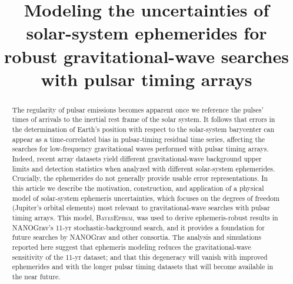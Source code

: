 \documentclass[iop,apj,twocolappendix]{emulateapj}
\begin{document}

\title{Modeling the uncertainties of solar-system ephemerides for robust gravitational-wave searches with pulsar timing arrays}






\begin{abstract}
The regularity of pulsar emissions becomes apparent once we reference the pulses' times of arrivals to the inertial rest frame of the solar system. It follows that errors in the determination of Earth's position with respect to the solar-system barycenter can appear as a time-correlated bias in pulsar-timing residual time series, affecting the searches for low-frequency gravitational waves performed with pulsar timing arrays.
Indeed, recent array datasets yield different gravitational-wave background upper limits and detection statistics when analyzed with different solar-system ephemerides. Crucially, the ephemerides do not generally provide usable error representations.
In this article we describe the motivation, construction, and application of a physical model of solar-system ephemeris uncertainties, which focuses on the degrees of freedom (Jupiter's orbital elements) most relevant to gravitational-wave searches with pulsar timing arrays.
This model, \textsc{BayesEphem}, was used to derive ephemeris-robust results in NANOGrav's 11-yr stochastic-background search, and it provides a foundation for future searches by NANOGrav and other consortia.
The analysis and simulations reported here suggest that ephemeris modeling reduces the gravitational-wave sensitivity of the 11-yr dataset; and that this degeneracy will vanish with improved ephemerides and with the longer pulsar timing datasets that will become available in the near future.
\end{abstract}


\maketitle
\end{document}
